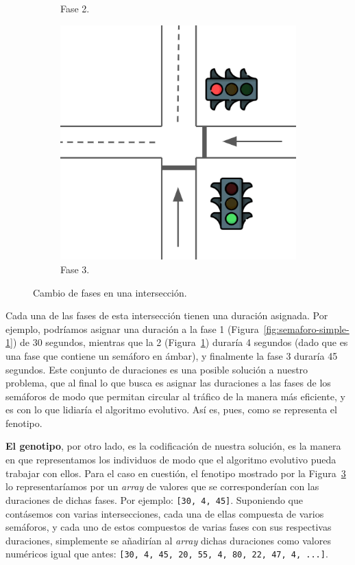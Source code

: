 \begin{figure}[ht]
\begin{subfigure}[t]{0.32\textwidth}
        \caption{Fase 2.}
        \label{fig:semaforo-simple-2}
    \end{subfigure}
    \hfill
    \begin{subfigure}[t]{0.32\textwidth}
        \centering
        \includegraphics[width=\textwidth]{report/images/semaforossimple3.png}
        \caption{Fase 3.}
        \label{fig:semaforo-simple-3}
    \end{subfigure}
    \caption{Cambio de fases en una intersección.}
    \label{fig:semaforo-simple}
\end{figure}

Cada una de las fases de esta intersección tienen una duración asignada. Por ejemplo, podríamos asignar una duración a la fase 1 (Figura~\ref{fig:semaforo-simple-1}) de 30 segundos, mientras que la 2 (Figura~\ref{fig:semaforo-simple-2}) duraría 4 segundos (dado que es una fase que contiene un semáforo en ámbar), y finalmente la fase 3 duraría 45 segundos. Este conjunto de duraciones es una posible solución a nuestro problema, que al final lo que busca es asignar las duraciones a las fases de los semáforos de modo que permitan circular al tráfico de la manera más eficiente, y es con lo que lidiaría el algoritmo evolutivo. Así es, pues, como se representa el fenotipo.

\textbf{El genotipo}, por otro lado, es la codificación de nuestra solución, es la manera en que representamos los individuos de modo que el algoritmo evolutivo pueda trabajar con ellos. Para el caso en cuestión, el fenotipo mostrado por la Figura~\ref{fig:semaforo-simple} lo representaríamos por un \textit{array} de valores que se corresponderían con las duraciones de dichas fases. Por ejemplo: \texttt{[30, 4, 45]}. Suponiendo que contásemos con varias intersecciones, cada una de ellas compuesta de varios semáforos, y cada uno de estos compuestos de varias fases con sus respectivas duraciones, simplemente se añadirían al \textit{array} dichas duraciones como valores numéricos igual que antes: \texttt{[30, 4, 45, 20, 55, 4, 80, 22, 47, 4, ...]}.

